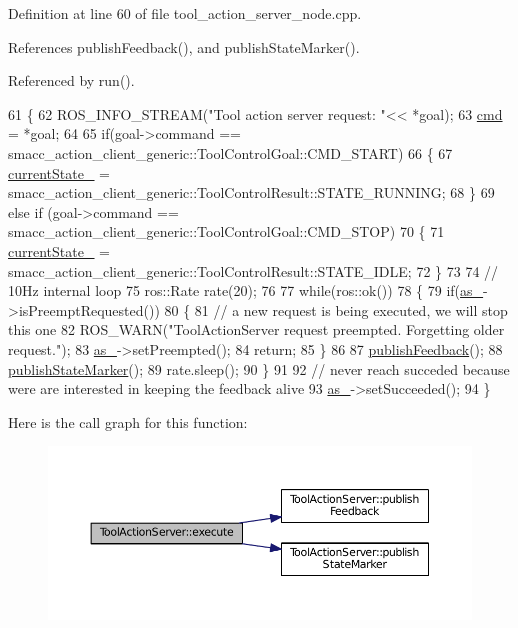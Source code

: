 Definition at line 60 of file tool\+\_\+action\+\_\+server\+\_\+node.\+cpp.



References publish\+Feedback(), and publish\+State\+Marker().



Referenced by run().


\begin{DoxyCode}
61 \{
62   ROS\_INFO\_STREAM(\textcolor{stringliteral}{"Tool action server request: "}<< *goal);
63   \hyperlink{classToolActionServer_ad2320c18b9cf85de44f77e9815368902}{cmd} = *goal;
64 
65   \textcolor{keywordflow}{if}(goal->command == smacc\_action\_client\_generic::ToolControlGoal::CMD\_START)
66   \{
67     \hyperlink{classToolActionServer_aac4862d8c313b07e8506eb0c74507fb1}{currentState\_} =  smacc\_action\_client\_generic::ToolControlResult::STATE\_RUNNING;
68   \}
69   \textcolor{keywordflow}{else}  \textcolor{keywordflow}{if} (goal->command == smacc\_action\_client\_generic::ToolControlGoal::CMD\_STOP)
70   \{
71     \hyperlink{classToolActionServer_aac4862d8c313b07e8506eb0c74507fb1}{currentState\_} =  smacc\_action\_client\_generic::ToolControlResult::STATE\_IDLE;
72   \}
73 
74   \textcolor{comment}{// 10Hz internal loop}
75   ros::Rate rate(20);
76 
77   \textcolor{keywordflow}{while}(ros::ok())
78   \{
79     \textcolor{keywordflow}{if}(\hyperlink{classToolActionServer_abeb62e08e08d40e6a65b199c86da6d69}{as\_}->isPreemptRequested())
80     \{
81        \textcolor{comment}{// a new request is being executed, we will stop this one}
82        ROS\_WARN(\textcolor{stringliteral}{"ToolActionServer request preempted. Forgetting older request."});
83        \hyperlink{classToolActionServer_abeb62e08e08d40e6a65b199c86da6d69}{as\_}->setPreempted(); 
84        \textcolor{keywordflow}{return};
85     \}
86     
87     \hyperlink{classToolActionServer_afe566312095ca250bc32f98a11774f2b}{publishFeedback}();
88     \hyperlink{classToolActionServer_aef01c70e358c933855db3a37b46a3740}{publishStateMarker}();
89     rate.sleep();
90   \}
91 
92    \textcolor{comment}{// never reach succeded because were are interested in keeping the feedback alive}
93    \hyperlink{classToolActionServer_abeb62e08e08d40e6a65b199c86da6d69}{as\_}->setSucceeded();
94 \}
\end{DoxyCode}


Here is the call graph for this function\+:
\nopagebreak
\begin{figure}[H]
\begin{center}
\leavevmode
\includegraphics[width=350pt]{classToolActionServer_a34bd6fce77510778d5a51385afeb36bb_cgraph}
\end{center}
\end{figure}




